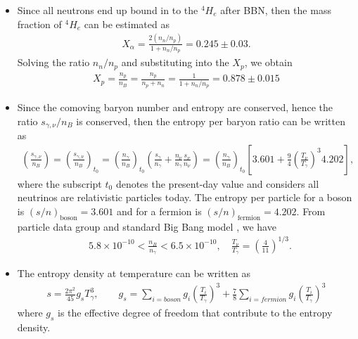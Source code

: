 \documentclass[universe,article,submit,moreauthors,pdftex,a4paper]{Definitions/mdpi}
\begin{document}
\begin{itemize}
  \item Since all neutrons end up bound in to the $^4H_e$ after BBN, then the mass fraction of $^4H_e$ can be estimated as \cite{ParticleDataGroup:2022pth}
\begin{align}
X_\alpha=\frac{2(n_n/n_p)}{1+n_n/n_p}=0.245\pm0.03.
\end{align} 
 Solving the ratio $n_n/n_p$ and substituting into the $X_p$, we obtain
\begin{align}
 X_p=\frac{n_p}{n_B}=\frac{n_p}{n_p+n_n}=\frac{1}{1+n_n/n_p}=0.878\pm0.015
\end{align}

  \item Since the comoving baryon number and entropy are conserved, hence the ratio $s_{\gamma,\nu}/n_B$ is conserved, then the entropy per baryon ratio can be written as
\begin{align}
\left(\frac{s_{\gamma,\nu}}{n_B}\right)=\left(\frac{s_{\gamma,\nu}}{n_B}\right)_{\!\!t_0}\!\!=\left(\frac{n_\gamma}{n_B}\right)_{\!\!t_0}\left(\frac{s_\gamma}{n_\gamma}+\frac{n_\nu}{n_\gamma}\frac{s_\nu}{n_\nu}\right)=\left(\frac{n_\gamma}{n_B}\right)_{\!\!t_0}\left[3.601+\frac{9}{4}\left(\frac{T_\nu}{T_\gamma}\right)^{\!\!3}4.202\right],
\end{align}
where the subscript $t_0$ denotes the present-day value and considers all neutrinos are relativistic particles today. The entropy per particle for a boson is $(s/n)_\mathrm{boson}=3.601$ and for a fermion is $(s/n)_\mathrm{fermion}=4.202$. From particle data group and standard Big Bang model \cite{ParticleDataGroup:2022pth,Kolb:1990vq}, we have
\begin{align}
&5.8\times10^{-10}<\frac{n_B}{n_\gamma}<6.5\times10^{-10},\quad\frac{T_\nu}{T_\gamma}=\left(\frac{4}{11}\right)^{1/3}.
\end{align}

  \item The entropy density at temperature can be written as \cite{Kolb:1990vq}
\begin{align}
s=\frac{2\pi^2}{45}g_sT_\gamma^3,\qquad g_s=\sum_{i=boson}g_i\left(\frac{T_i}{T_\gamma}\right)^3+\frac{7}{8}\sum_{i=fermion}g_i\left(\frac{T_i}{T_\gamma}\right)^3
\end{align}
where $g_s$ is the effective degree of freedom that contribute to the entropy density.  
\end{itemize}
 
\end{document}
